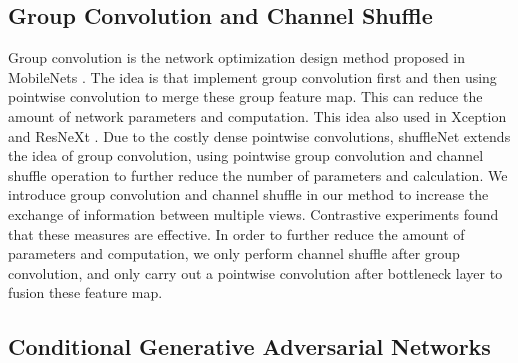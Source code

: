 \documentclass{IEEE_lsens}
\begin{document}
\subsection{Group Convolution and Channel Shuffle}

Group convolution is the network optimization design method proposed in MobileNets \cite{Howard2017:apa:Mobilenets} . The idea is that implement group convolution first and then using pointwise convolution to merge these group feature map. This can reduce the amount of network parameters and computation. This idea also used in Xception \cite{Chollet2017::Xception:} and ResNeXt \cite{Xie2017::Aggregated}. Due to the costly dense pointwise convolutions, shuffleNet \cite{Zhang2017:apa:Shufflenet} extends the idea of group convolution, using pointwise group convolution and channel shuffle operation to further reduce the number of parameters and calculation.
We introduce group convolution and channel shuffle in our method to increase the exchange of information between multiple views.
Contrastive experiments found that these measures are effective. In order to further reduce the amount of parameters and computation, we only perform channel shuffle after group convolution, and only carry out a pointwise convolution after bottleneck layer to fusion these feature map.

\subsection{Conditional Generative Adversarial Networks}
\end{document}
